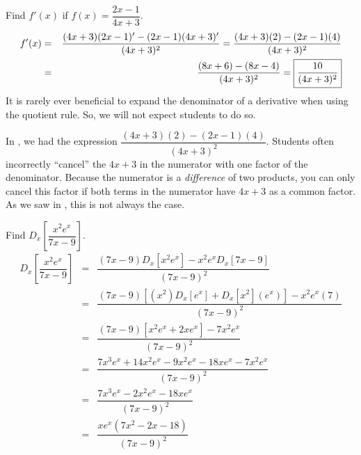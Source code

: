 \documentclass{book}
\begin{document}
\begin{Exam}\label{exam:quotient} Find $f'(x)$ if $f(x) =\dfrac{2x-1}{4x+3}$.
\begin{eqnarray*}
f'(x) &=& \dfrac{(4x+3)(2x-1)' - (2x-1)(4x+3)'}{(4x+3)^2} = \dfrac{(4x+3)(2) - (2x-1)(4)}{(4x+3)^2}\\
&=& \dfrac{(8x+6) - (8x-4)}{(4x+3)^2} = \fbox{$\dfrac{10}{(4x+3)^2}$}
\end{eqnarray*} It is rarely ever beneficial to expand the denominator of a derivative when using the quotient rule. So, we will not expect students to do so. 
\end{Exam}\vs

In , we had the expression $ \dfrac{(4x+3)(2) - (2x-1)(4)}{(4x+3)^2}$. Students often incorrectly ``cancel'' the $4x+3$ in the numerator with one factor of the denominator. Because the numerator is a \emph{difference} of two products, you can only cancel this factor if both terms in the numerator have $4x+3$ as a common factor. As we saw in , this is not always the case. 

\begin{Exam} Find $D_x\left[\dfrac{x^2e^x}{7x-9}\right]$.\\ %

\begin{eqnarray*}
D_x\left[\dfrac{x^2e^x}{7x-9}\right] &=& \dfrac{(7x-9)D_x\left[x^2e^x\right] - x^2e^xD_x\left[7x-9\right]}{(7x-9)^2}\\
&=& \dfrac{(7x-9)\left[(x^2)D_x[e^x] + D_x[x^2](e^x)\right] - x^2e^x(7)}{(7x-9)^2}\\
&=& \dfrac{(7x-9)\left[x^2e^x+2xe^x\right] - 7x^2e^x}{(7x-9)^2}\\
&=& \dfrac{7x^3e^x+14x^2e^x-9x^2e^x-18xe^x - 7x^2e^x}{(7x-9)^2}\\
&=& \dfrac{7x^3e^x-2x^2e^x-18xe^x}{(7x-9)^2}\\
&=& \dfrac{xe^x(7x^2-2x-18)}{(7x-9)^2}\\
\end{eqnarray*}
\end{Exam}\vs
\end{document}
